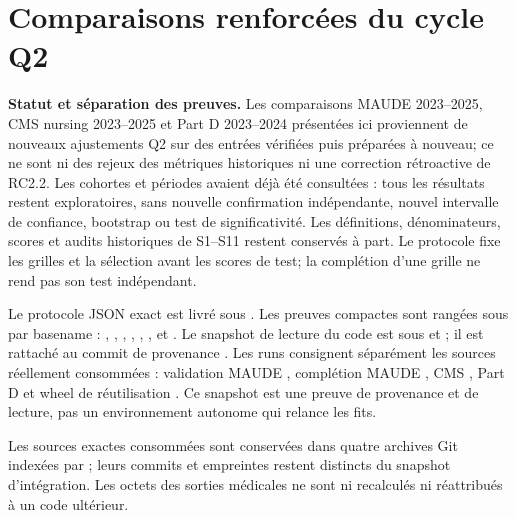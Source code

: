 \par{}
\section{Comparaisons renforcées du cycle Q2}
\label{supp:q2-comparisons}

\textbf{Statut et séparation des preuves.} Les comparaisons MAUDE 2023--2025, CMS nursing 2023--2025 et Part D 2023--2024 présentées ici proviennent de nouveaux ajustements Q2 sur des entrées vérifiées puis préparées à nouveau; ce ne sont ni des rejeux des métriques historiques ni une correction rétroactive de RC2.2. Les cohortes et périodes avaient déjà été consultées : tous les résultats restent exploratoires, sans nouvelle confirmation indépendante, nouvel intervalle de confiance, bootstrap ou test de significativité. Les définitions, dénominateurs, scores et audits historiques de S1--S11 restent conservés à part. Le protocole fixe les grilles et la sélection avant les scores de test; la complétion d'une grille ne rend pas son test indépendant\cite{hgbq2methods,hgbcode}.

Le protocole JSON exact est livré sous . Les preuves compactes sont rangées sous  par basename : , , , , , ,  et . Le snapshot de lecture du code est sous  et ; il est rattaché au commit de provenance . Les runs consignent séparément les sources réellement consommées : validation MAUDE , complétion MAUDE , CMS , Part D  et wheel de réutilisation . Ce snapshot est une preuve de provenance et de lecture, pas un environnement autonome qui relance les fits.

Les sources exactes consommées sont conservées dans quatre archives Git indexées par ; leurs commits et empreintes restent distincts du snapshot d'intégration. Les octets des sorties médicales ne sont ni recalculés ni réattribués à un code ultérieur.

